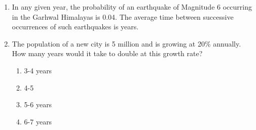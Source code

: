 \documentclass[journal,12pt,onecolumn]{IEEEtran}
\theoremstyle{remark}
\begin{document}
\begin{enumerate}
    \vspace{0.5cm}

    \item In any given year, the probability of an earthquake of Magnitude 6 occurring in the Garhwal Himalayas is 0.04. The average time between successive occurrences of such earthquakes is \underline{\hspace{2cm}} years.

    \vspace{0.5cm}
    
    \item The population of a new city is 5 million and is growing at 20\% annually. How many years would it take to double at this growth rate?
    \begin{multicols}{4}
        \begin{enumerate}
            \item 3-4 years
            \item 4-5
            \item 5-6 years
            \item 6-7 years
        \end{enumerate}
    \end{multicols}

\end{enumerate}
\end{document}
